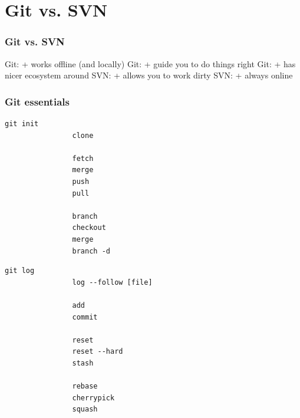 \documentclass{beamer}
\begin{document}
    \section{Git vs. SVN}
    \begin{frame}
        \frametitle{Git vs. SVN}
        Git: + works offline (and locally)
        Git: + guide you to do things right
        Git: + has nicer ecosystem around
        SVN: + allows you to work dirty
        SVN: + always online
    \end{frame}
    

    \begin{frame}[fragile]
        \frametitle{Git essentials}
        \begin{multicols}{2}
        \begin{lstlisting}[gobble=12]
            git init                
                clone

                fetch
                merge
                push
                pull

                branch
                checkout
                merge
                branch -d
        \end{lstlisting}
        \begin{lstlisting}[gobble=12]
            git log                
                log --follow [file]

                add
                commit

                reset
                reset --hard
                stash

                rebase
                cherrypick
                squash
        \end{lstlisting}
        \end{multicols}
    \end{frame}
\end{document}
